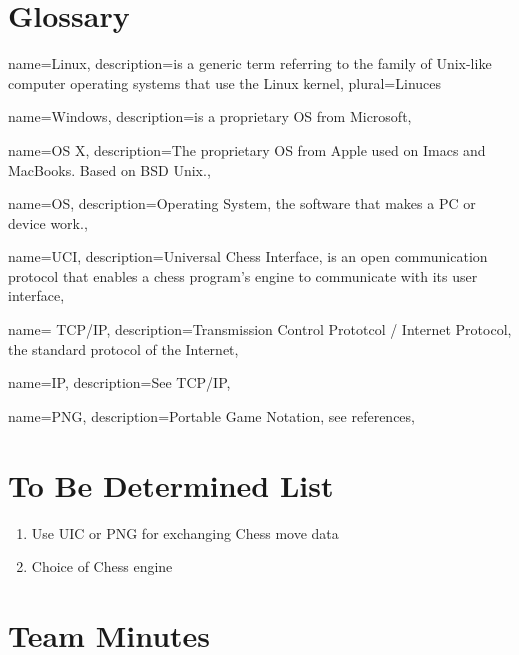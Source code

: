 \documentclass[a4paper,10pt]{article}
\begin{document}
\begin{appendices}
\section{Glossary}

{
  name=Linux,
  description={is a generic term referring to the family of Unix-like
               computer operating systems that use the Linux kernel},
  plural=Linuces
}

{
  name=Windows, 
  description={is a proprietary OS  from Microsoft\textregistered},
}

{
  name=OS X,
  description={The proprietary OS from Apple\textregistered{} used on Imacs\textregistered{}  and MacBooks\textregistered. Based on  BSD Unix.},
}

{
  name=OS,
  description={Operating System, the software that makes a PC or device work.},
}

{
  name=UCI,
  description={Universal Chess Interface, is an open communication protocol that enables a chess program's engine to communicate with its user interface},
}

{
  name= TCP/IP,
  description={Transmission Control Prototcol / Internet Protocol, the standard protocol of the Internet},
}

{
  name=IP,
  description={See TCP/IP},
}


{
  name=PNG,
  description={Portable Game Notation, see references},
}




\printglossaries
\glsaddall


\section{To Be Determined List \label{TBDList}}
\begin{enumerate}
  \item Use UIC or PNG for exchanging Chess move data
\item Choice of Chess engine
\end{enumerate}


\section {Team Minutes}
\begin{lstlisting}[frame=single,caption=Meeting of 9/2/15,label=minutes1]



\end{lstlisting}
\end{appendices}
\end{document}
